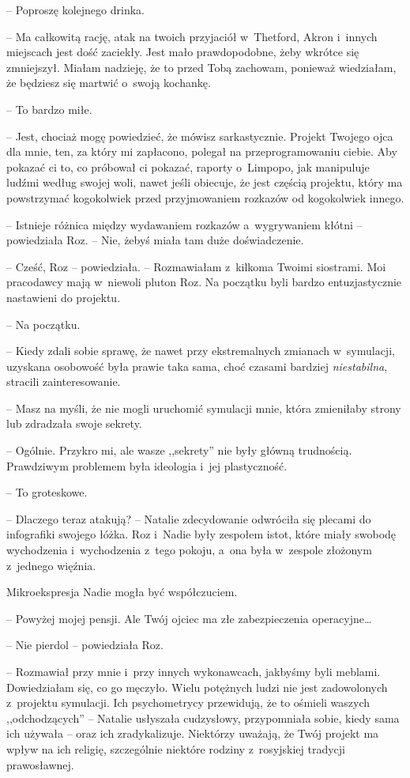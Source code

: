 \documentclass[oneside,polish,11pt,sfheadings]{mwbk}
\begin{document}
-- Poproszę kolejnego drinka.

-- Ma całkowitą rację, atak na twoich przyjaciół w~Thetford, Akron i~innych miejscach jest dość zaciekły. Jest mało prawdopodobne, żeby
wkrótce się zmniejszył. Miałam nadzieję, że to przed Tobą zachowam,
ponieważ wiedziałam, że będziesz się martwić o~swoją kochankę.

-- To bardzo miłe.

-- Jest, chociaż mogę powiedzieć, że mówisz sarkastycznie. Projekt
Twojego ojca dla mnie, ten, za który mi zapłacono, polegał na
przeprogramowaniu ciebie. Aby pokazać ci to, co próbował ci pokazać,
raporty o~Limpopo, jak manipuluje ludźmi według swojej woli, nawet jeśli
obiecuje, że jest częścią projektu, który ma powstrzymać kogokolwiek
przed przyjmowaniem rozkazów od kogokolwiek innego.

-- Istnieje różnica między wydawaniem rozkazów a~wygrywaniem kłótni -- powiedziała Roz. -- Nie, żebyś miała tam duże doświadczenie.

-- Cześć, Roz -- powiedziała. -- Rozmawiałam z~kilkoma Twoimi siostrami.
Moi pracodawcy mają w~niewoli pluton Roz. Na początku byli bardzo
entuzjastycznie nastawieni do projektu.

-- Na początku.

-- Kiedy zdali sobie sprawę, że nawet przy ekstremalnych zmianach w~symulacji, uzyskana osobowość była prawie taka sama, choć czasami
bardziej \textit{niestabilna}, stracili zainteresowanie.

-- Masz na myśli, że nie mogli uruchomić symulacji mnie, która zmieniłaby
strony lub zdradzała swoje sekrety.

-- Ogólnie. Przykro mi, ale wasze ,,sekrety'' nie były główną trudnością.
Prawdziwym problemem była ideologia i~jej plastyczność.

-- To groteskowe.

-- Dlaczego teraz atakują? -- Natalie zdecydowanie odwróciła się plecami
do infografiki swojego łóżka. Roz i~Nadie były zespołem istot, które
miały swobodę wychodzenia i~wychodzenia z~tego pokoju, a~ona była w~zespole złożonym z~jednego więźnia.

Mikroekspresja Nadie mogła być współczuciem. 

-- Powyżej mojej pensji. Ale
Twój ojciec ma złe zabezpieczenia operacyjne\ldots 

-- Nie pierdol -- powiedziała Roz.

-- Rozmawiał przy mnie i~przy innych wykonawcach, jakbyśmy byli meblami.
Dowiedziałam się, co go męczyło. Wielu potężnych ludzi nie jest
zadowolonych z~projektu symulacji. Ich psychometrycy przewidują, że to
ośmieli waszych ,,odchodzących'' -- Natalie usłyszała cudzysłowy,
przypomniała sobie, kiedy sama ich używała -- oraz ich zradykalizuje.
Niektórzy uważają, że Twój projekt ma wpływ na ich religię, szczególnie
niektóre rodziny z~rosyjskiej tradycji prawosławnej.
\end{document}

